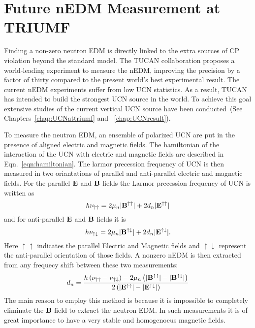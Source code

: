 \chapter{Future nEDM Measurement at TRIUMF}

Finding a non-zero neutron EDM is directly linked to the extra sources
of CP violation beyond the standard model. The TUCAN collaboration
proposes a world-leading experiment to measure the nEDM, improving the
precision by a factor of thirty compared to the present world’s best
experimental result. The current nEDM experiments suffer from low UCN
statistics. As a result, TUCAN has intended to build the strongest UCN
source in the world. To achieve this goal extensive studies of the
current vertical UCN source have been conducted~(See
Chapters~\ref{chap:UCNattriumf} and ~\ref{chap:UCNresult}).

To measure the neutron EDM, an ensemble of polarized UCN are put in
the presence of aligned electric and magnetic fields. The hamiltonian
of the interaction of the UCN with electric and magnetic fields are
described in Eqn.~\ref{eqn:hamiltonian}.  The larmor precession
frequency of UCN is then measured in two oriantations of parallel and
anti-parallel electric and magnetic fields. For the parallel $\bf{E}$
and $\bf{B}$ fields the Larmor precession frequency of UCN is written
as
\begin{equation}
\label{eqn:parallelEandB}
  h \nu_{\uparrow \uparrow} = 2 \mu_n \vert {\bf{B^{\uparrow \uparrow}}} \vert+ 2 d_n\vert \bf{ E^{\uparrow \uparrow}} \vert
\end{equation}
and for anti-parallel  $\bf{E}$ and $\bf{B}$ fields it is
\begin{equation}
\label{eqn:antiparallelEandB}
  h \nu_{\uparrow \downarrow} = 2 \mu_n \vert {\bf{B^{\uparrow \downarrow}}} \vert+ 2 d_n\vert \bf{ E^{\uparrow \downarrow}} \vert.
\end{equation}
Here $\uparrow \uparrow$ indicates the parallel Electric and Magnetic
fields and $\uparrow \downarrow$ represent the anti-parallel
orientation of those fields.
A nonzero nEDM is then extracted from any frequecy shift between these
two measurements:
\begin{equation}
  \label{eqn:dn}
  d_n = \frac{h \left( \nu_{\uparrow \uparrow} - \nu_{\uparrow \downarrow} \right) - 2 \mu_n \left( \vert {\bf{B^{\uparrow \uparrow}}} \vert -\vert {\bf{B^{\uparrow \downarrow}}} \vert \right)}{2 \left(\vert \bf{ E^{\uparrow \uparrow}} \vert - \vert \bf{ E^{\uparrow \downarrow}} \vert \right)}
\end{equation}
The main reason to employ this method is because it is impossible to
completely eliminate the $\bf{B}$ field to extract the neutron EDM. In
such measurements it is of great importance to have a very stable and
homogenoeus magnetic fields.

